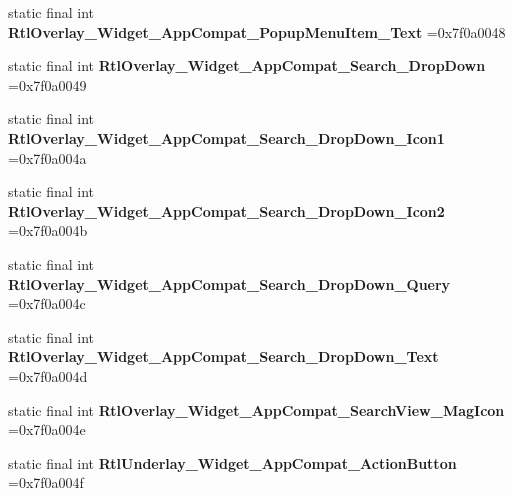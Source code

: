 \begin{DoxyCompactItemize}
static final int {\bfseries Rtl\+Overlay\+\_\+\+Widget\+\_\+\+App\+Compat\+\_\+\+Popup\+Menu\+Item\+\_\+\+Text} =0x7f0a0048
\item 
\mbox{\label{classproject4_1_1xaria_1_1R_1_1style_abc9477378db5493a7475a02d50aa5ea0}} 
static final int {\bfseries Rtl\+Overlay\+\_\+\+Widget\+\_\+\+App\+Compat\+\_\+\+Search\+\_\+\+Drop\+Down} =0x7f0a0049
\item 
\mbox{\label{classproject4_1_1xaria_1_1R_1_1style_a1d3cdd78c7661c751c5ba0e841703cd7}} 
static final int {\bfseries Rtl\+Overlay\+\_\+\+Widget\+\_\+\+App\+Compat\+\_\+\+Search\+\_\+\+Drop\+Down\+\_\+\+Icon1} =0x7f0a004a
\item 
\mbox{\label{classproject4_1_1xaria_1_1R_1_1style_ad023def7893f5b094ff57d99555d761c}} 
static final int {\bfseries Rtl\+Overlay\+\_\+\+Widget\+\_\+\+App\+Compat\+\_\+\+Search\+\_\+\+Drop\+Down\+\_\+\+Icon2} =0x7f0a004b
\item 
\mbox{\label{classproject4_1_1xaria_1_1R_1_1style_acc97500ddf171edb4e598b0e3385c8aa}} 
static final int {\bfseries Rtl\+Overlay\+\_\+\+Widget\+\_\+\+App\+Compat\+\_\+\+Search\+\_\+\+Drop\+Down\+\_\+\+Query} =0x7f0a004c
\item 
\mbox{\label{classproject4_1_1xaria_1_1R_1_1style_a7a120946bb6ca72058a18426911f8483}} 
static final int {\bfseries Rtl\+Overlay\+\_\+\+Widget\+\_\+\+App\+Compat\+\_\+\+Search\+\_\+\+Drop\+Down\+\_\+\+Text} =0x7f0a004d
\item 
\mbox{\label{classproject4_1_1xaria_1_1R_1_1style_a5fcbc1e1a821dfe139a7652a9209a250}} 
static final int {\bfseries Rtl\+Overlay\+\_\+\+Widget\+\_\+\+App\+Compat\+\_\+\+Search\+View\+\_\+\+Mag\+Icon} =0x7f0a004e
\item 
\mbox{\label{classproject4_1_1xaria_1_1R_1_1style_acd17d3f6f297af9f95f16a60fffc0b5d}} 
static final int {\bfseries Rtl\+Underlay\+\_\+\+Widget\+\_\+\+App\+Compat\+\_\+\+Action\+Button} =0x7f0a004f
\item 
\mbox{\label{classproject4_1_1xaria_1_1R_1_1style_ad15eb0204bb753a8e4a5100620dab46e}} 

\end{DoxyCompactItemize}
